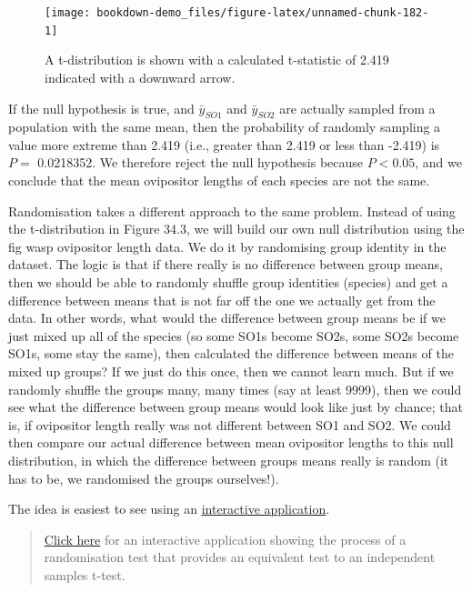 \documentclass[
]{scrbook}
\begin{document}
\begin{figure}
\texttt{[image: bookdown-demo\_files/figure-latex/unnamed-chunk-182-1]} \caption{A t-distribution is shown with a calculated t-statistic of 2.419 indicated with a downward arrow.}\label{fig:unnamed-chunk-182}
\end{figure}

If the null hypothesis is true, and \(\bar{y}_{SO1}\) and \(\bar{y}_{SO2}\) are actually sampled from a population with the same mean, then the probability of randomly sampling a value more extreme than 2.419 (i.e., greater than 2.419 or less than -2.419) is \(P =\) 0.0218352.
We therefore reject the null hypothesis because \(P < 0.05\), and we conclude that the mean ovipositor lengths of each species are not the same.

Randomisation takes a different approach to the same problem.
Instead of using the t-distribution in Figure 34.3, we will build our own null distribution using the fig wasp ovipositor length data.
We do it by randomising group identity in the dataset.
The logic is that if there really is no difference between group means, then we should be able to randomly shuffle group identities (species) and get a difference between means that is not far off the one we actually get from the data.
In other words, what would the difference between group means be if we just mixed up all of the species (so some SO1s become SO2s, some SO2s become SO1s, some stay the same), then calculated the difference between means of the mixed up groups?
If we just do this once, then we cannot learn much.
But if we randomly shuffle the groups many, many times (say at least 9999), then we could see what the difference between group means would look like just by chance; that is, if ovipositor length really was not different between SO1 and SO2.
We could then compare our actual difference between mean ovipositor lengths to this null distribution, in which the difference between groups means really is random (it has to be, we randomised the groups ourselves!).

The idea is easiest to see using an \href{https://bradduthie.shinyapps.io/randomisation/}{interactive application}.

\begin{quote}
\href{https://bradduthie.shinyapps.io/randomisation/}{Click here} for an interactive application showing the process of a randomisation test that provides an equivalent test to an independent samples t-test.
\end{quote}
\end{document}
